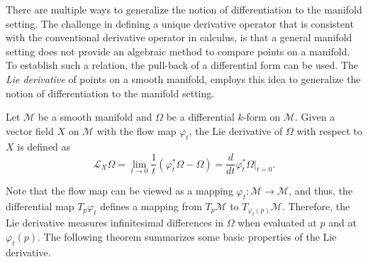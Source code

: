 There are multiple ways to generalize the notion of differentiation to the manifold setting. The challenge in defining a unique derivative operator that is consistent with the conventional derivative operator in calculus, is that a general manifold setting does not provide an algebraic method to compare points on a manifold. To establish such a relation, the pull-back of a differential form can be used. The \emph{Lie derivative} of points on a smooth manifold, employs this idea to generalize the notion of differentiation to the manifold setting.
\begin{definition}
Let $\mathcal M$ be a smooth manifold and $\Omega$ be a differential $k$-form on $\mathcal M$. Given a vector field $X$ on $\mathcal M$ with the flow map $\varphi_t$, the Lie derivative of $\Omega$ with respect to $X$ is defined as
\begin{equation} \label{eq:2.10}
	\mathcal L_X \Omega = \lim_{t\to 0} \frac 1 t (\varphi^*_t \Omega - \Omega) = \frac {d}{dt} \varphi^*_t \Omega |_{t=0}.
\end{equation}
\end{definition}
Note that the flow map can be viewed as a mapping $\varphi_t:\mathcal M \to \mathcal M$, and thus, the differential map $T_p \varphi _t$ defines a mapping from $T_p \mathcal M$ to $T_{ \varphi_t(p) } \mathcal M$. Therefore, the Lie derivative measures infinitesimal differences in $\Omega$ when evaluated at $p$ and at $\varphi_t(p)$. The following theorem summarizes some basic properties of the Lie derivative.

